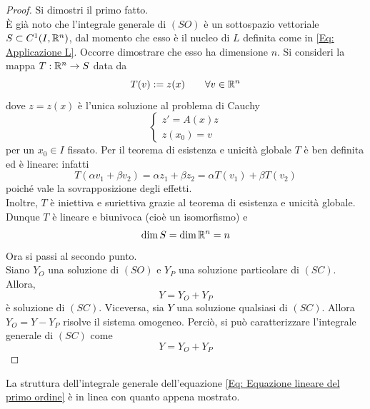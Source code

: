 \begin{proof}
    Si dimostri il primo fatto.\\
    È già noto che l'integrale generale di $(SO)$ è un sottospazio vettoriale $S \subset C^1(I, \mathbb{R}^n)$, dal momento che esso è il nucleo di $L$ definita come in \eqref{Eq: Applicazione L}. Occorre dimostrare che esso ha dimensione $n$.
    Si consideri la mappa $T: \mathbb{R}^n\to S$ data da
    \begin{equation}
        T(v):=z(x) \qquad \forall v \in \mathbb{R}^n
    \end{equation}
    dove $z=z(x)$ è l'unica soluzione al problema di Cauchy \begin{equation}
        \begin{cases}    
        z'=A(x)z\\
        z(x_0)= v
        \end{cases}
    \end{equation}
    per un $x_0 \in I$ fissato. Per il teorema di esistenza e unicità globale $T$ è ben definita ed è lineare: infatti
    \begin{equation}
        T(\alpha v_1 + \beta v_2)= \alpha z_1 + \beta z_2 = \alpha T(v_1)+ \beta T(v_2)
    \end{equation}
    poiché vale la sovrapposizione degli effetti.\\
    Inoltre, $T$ è iniettiva e suriettiva grazie al teorema di esistenza e unicità globale. Dunque $T$ è lineare e biunivoca (cioè un isomorfismo) e \begin{equation}
        \dim S = \dim \mathbb{R}^n = n
    \end{equation}
    Ora si passi al secondo punto.\\
    Siano $Y_O$ una soluzione di $(SO)$ e $Y_P$ una soluzione particolare di $(SC)$. Allora,
    \begin{equation}
        Y=Y_O+Y_P
    \end{equation}
    è soluzione di $(SC)$. Viceversa, sia $Y$ una soluzione qualsiasi di $(SC)$. Allora $Y_O=Y-Y_P$ risolve il sistema omogeneo. Perciò, si può caratterizzare l'integrale generale di $(SC)$ come 
    \begin{equation}
        Y=Y_O+Y_P
    \end{equation}
\end{proof} 
\begin{oss}
    La struttura dell'integrale generale dell'equazione \eqref{Eq: Equazione lineare del primo ordine} è in linea con quanto appena mostrato.
\end{oss}
